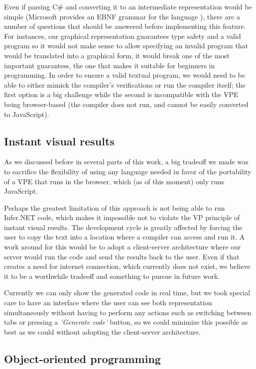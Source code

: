 Even if parsing C# and converting it to an intermediate representation would be
simple (Microsoft provides an EBNF grammar for the language \cite{ebnfcs}), there
are a number of questions that should be answered before implementing this feature.
For instances, our graphical representation guarantees type safety and a valid
program so it would not make sense to allow specifying an invalid program that
would be translated into a graphical form, it would break one of the most important
guarantess, the one that makes it suitable for beginners in programming. In
order to ensure a valid textual program, we would need to be able to either mimick
the compiler's verifications or run the compiler itself; the first option is
a big challenge while the second is incompatible with the VPE being browser-based
(the compiler does not run, and cannot be easily converted to JavaScript).

\subsection{Instant visual results}

As we discussed before in several parts of this work, a big tradeoff we made was
to sacrifice the flexibility of using any language needed in favor of the portability
of a VPE that runs in the browser, which (as of this moment) only runs JavaScript.

Perhaps the greatest limitation of this approach is not being able to run Infer.NET
code, which makes it impossible not to violate the VP principle of instant visual results.
The development cycle is greatly affected by forcing the user to copy the text
into a location where a compiler can access and run it. A work around for this
would be to adopt a client-server architecture where our server would run the code
and send the results back to the user. Even if that creates a need for internet
connection, which currently does not exist, we believe it to be a worthwhile tradeoff
and something to pursue in future work.

Currently we can only show the generated code in real time, but we took special
care to have an interface where the user can see both representation simultaneously
without having to perform any actions such as switching between tabs or pressing
a \textit{'Generate code'} button, so we could minimize this possible as best as we could
without adopting the client-server architecture.

\subsection{Object-oriented programming}

